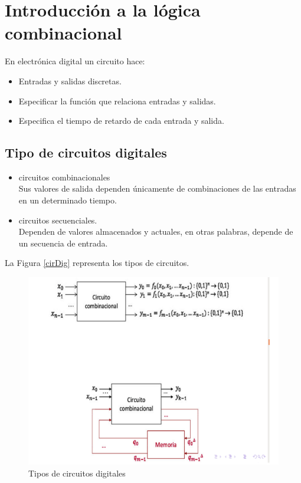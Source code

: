 \documentclass[12pt,letterpaper]{book}
\begin{document}
\section{Introducción a la lógica combinacional}

En electrónica digital un circuito hace:
\begin{itemize}
\item Entradas y salidas discretas.
\item Especificar la función que relaciona entradas y salidas.
\item Especifica el tiempo de retardo de cada entrada y salida.
\end{itemize}

\subsection{Tipo de circuitos digitales}

\begin{itemize}
\item circuitos combinacionales\\

Sus valores de salida dependen únicamente de combinaciones de las entradas en un determinado tiempo.

\item circuitos secuenciales.\\

Dependen de valores almacenados y actuales, en otras palabras, depende de un secuencia de entrada.\\

\end{itemize}


La Figura \ref{cirDig} representa los tipos de circuitos.


\begin{figure}[H]
\centering
\includegraphics[width=1\linewidth]{figures/cirDig1.png}
\caption{Tipos de circuitos digitales}
\label{cirDig1}
\end{figure}
\vspace{0.2cm}
\end{document}
